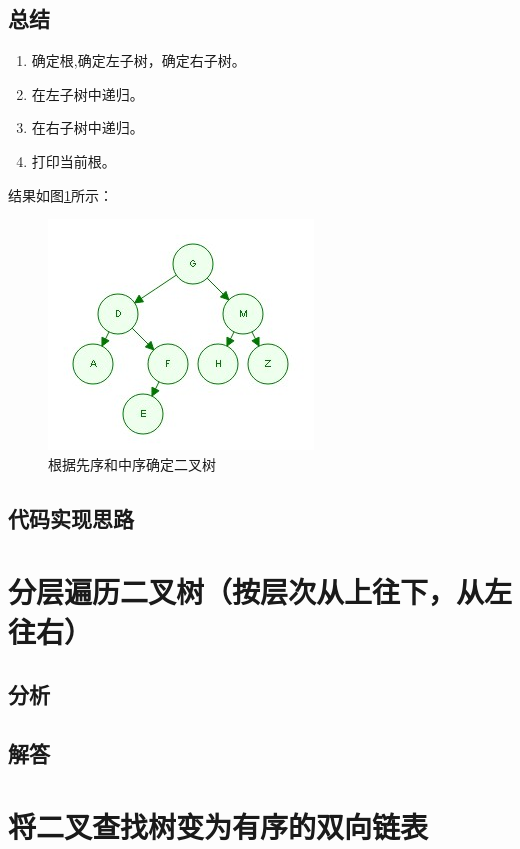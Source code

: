 \documentclass[UTF8,a4paper,12pt]{ctexbook}
\begin{document}
	\subsection{总结}
		\begin{enumerate}
			\item 确定根,确定左子树，确定右子树。
			\item 在左子树中递归。
			\item 在右子树中递归。
			\item 打印当前根。
		\end{enumerate}
		
		结果如图\ref{mid_first}所示：
			\begin{figure}[H]
				\centering
				\includegraphics{Tree_Mid_First}
				\caption{根据先序和中序确定二叉树}
				\label{mid_first}
			\end{figure}
	
	\subsection{代码实现思路}

	
\section{分层遍历二叉树（按层次从上往下，从左往右）}
	\subsection{分析}
	
	\subsection{解答}
	
\section{将二叉查找树变为有序的双向链表}
\end{document}
